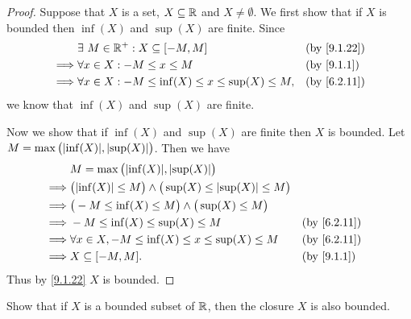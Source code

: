 \begin{proof}
  Suppose that \(X\) is a set, \(X \subseteq \mathbb{R}\) and \(X \neq \emptyset\).
  We first show that if \(X\) is bounded then \(\inf(X)\) and \(\sup(X)\) are finite.
  Since
  \begin{align*}
             & \exists\ M \in \R^+ : X \subseteq [-M, M]                     &  & \text{(by \cref{9.1.22})} \\
    \implies & \forall x \in X : -M \leq x \leq M                            &  & \text{(by \cref{9.1.1})}  \\
    \implies & \forall x \in X : -M \leq \inf(X) \leq x \leq \sup(X) \leq M, &  & \text{(by \cref{6.2.11})}
  \end{align*}
  we know that \(\inf(X)\) and \(\sup(X)\) are finite.

  Now we show that if \(\inf(X)\) and \(\sup(X)\) are finite then \(X\) is bounded.
  Let \(M = \max\big(\abs{\inf(X)}, \abs{\sup(X)}\big)\).
  Then we have
  \begin{align*}
             & M = \max\big(\abs{\inf(X)}, \abs{\sup(X)}\big)                                                                  \\
    \implies & \big(\abs{\inf(X)} \leq M\big) \land \big(\sup(X) \leq \abs{\sup(X)} \leq M\big)                                \\
    \implies & \big(-M \leq \inf(X) \leq M\big) \land \big(\sup(X) \leq M\big)                                                 \\
    \implies & -M \leq \inf(X) \leq \sup(X) \leq M                                              &  & \text{(by \cref{6.2.11})} \\
    \implies & \forall x \in X, -M \leq \inf(X) \leq x \leq \sup(X) \leq M                      &  & \text{(by \cref{6.2.11})} \\
    \implies & X \subseteq [-M, M].                                                             &  & \text{(by \cref{9.1.1})}
  \end{align*}
  Thus by \cref{9.1.22} \(X\) is bounded.
\end{proof}

\begin{ex}\label{ex:9.1.11}
  Show that if \(X\) is a bounded subset of \(\mathbb{R}\), then the closure \(X\) is also bounded.
\end{ex}

